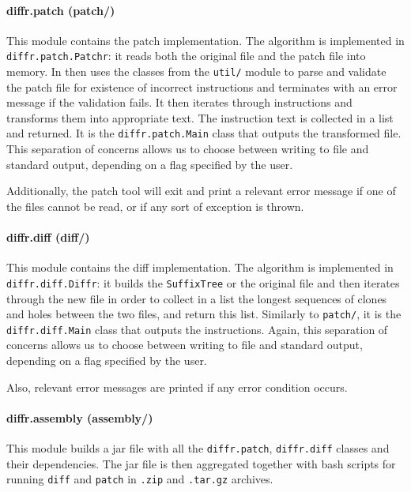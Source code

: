 \paragraph{diffr.patch (patch/)} 
This module contains the patch implementation. The algorithm is implemented in \texttt{diffr.patch.Patchr}: it reads both the original file and the patch file into memory. In then uses the classes from the \texttt{util/} module to parse and validate the patch file for existence of incorrect instructions and terminates with an error message if the validation fails. It then iterates through instructions and transforms them into appropriate text. The instruction text is collected in a list and returned. It is the \texttt{diffr.patch.Main} class that outputs the transformed file. This separation of concerns allows us to choose between writing to file and standard output, depending on a flag specified by the user.

Additionally, the patch tool will exit and print a relevant error message if one of the files cannot be read, or if any sort of exception is thrown.

\paragraph{diffr.diff (diff/)}

This module contains the diff implementation. The algorithm is implemented in \texttt{diffr.diff.Diffr}: it builds the \texttt{SuffixTree} or the original file and then iterates through the new file in order to collect in a list the longest sequences of clones and holes between the two files, and return this list. Similarly to \texttt{patch/}, it is the \texttt{diffr.diff.Main} class that outputs the instructions. Again, this separation of concerns allows us to choose between writing to file and standard output, depending on a flag specified by the user.

Also, relevant error messages are printed if any error condition occurs.

\paragraph{diffr.assembly (assembly/)}
This module builds a jar file with all the \texttt{diffr.patch}, \texttt{diffr.diff} classes and their dependencies. The jar file is then aggregated together with bash scripts for running \texttt{diff} and \texttt{patch} in \texttt{.zip} and \texttt{.tar.gz} archives.

